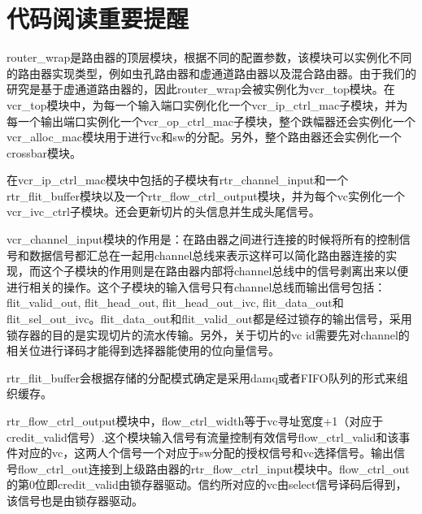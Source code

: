 ﻿\documentclass[10pt,journal]{IEEEtran}
\begin{document}
\section{代码阅读重要提醒}
router\_wrap是路由器的顶层模块，根据不同的配置参数，该模块可以实例化不同的路由器实现类型，例如虫孔路由器和虚通道路由器以及混合路由器。由于我们的研究是基于虚通道路由器的，因此router\_wrap会被实例化为vcr\_top模块。在vcr\_top模块中，为每一个输入端口实例化化一个vcr\_ip\_ctrl\_mac子模块，并为每一个输出端口实例化一个vcr\_op\_ctrl\_mac子模块，整个跌幅器还会实例化一个vcr\_alloc\_mac模块用于进行vc和sw的分配。另外，整个路由器还会实例化一个crossbar模块。

在vcr\_ip\_ctrl\_mac模块中包括的子模块有rtr\_channel\_input和一个rtr\_flit\_buffer模块以及一个rtr\_flow\_ctrl\_output模块，并为每个vc实例化一个vcr\_ivc\_ctrl子模块。还会更新切片的头信息并生成头尾信号。

vcr\_channel\_input模块的作用是：在路由器之间进行连接的时候将所有的控制信号和数据信号都汇总在一起用channel总线来表示这样可以简化路由器连接的实现，而这个子模块的作用则是在路由器内部将channel总线中的信号剥离出来以便进行相关的操作。这个子模块的输入信号只有channel总线而输出信号包括：flit\_valid\_out, flit\_head\_out, flit\_head\_out\_ivc, flit\_data\_out和flit\_sel\_out\_ivc。flit\_data\_out和flit\_valid\_out都是经过锁存的输出信号，采用锁存器的目的是实现切片的流水传输。另外，关于切片的vc id需要先对channel的相关位进行译码才能得到选择器能使用的位向量信号。

rtr\_flit\_buffer会根据存储的分配模式确定是采用damq或者FIFO队列的形式来组织缓存。

rtr\_flow\_ctrl\_output模块中，flow\_ctrl\_width等于vc寻址宽度+1（对应于credit\_valid信号）.这个模块输入信号有流量控制有效信号flow\_ctrl\_valid和该事件对应的vc，这两人个信号一个对应于sw分配的授权信号和vc选择信号。输出信号flow\_ctrl\_out连接到上级路由器的rtr\_flow\_ctrl\_input模块中。flow\_ctrl\_out的第0位即credit\_valid由锁存器驱动。信约所对应的vc由select信号译码后得到，该信号也是由锁存器驱动。
\end{document}
